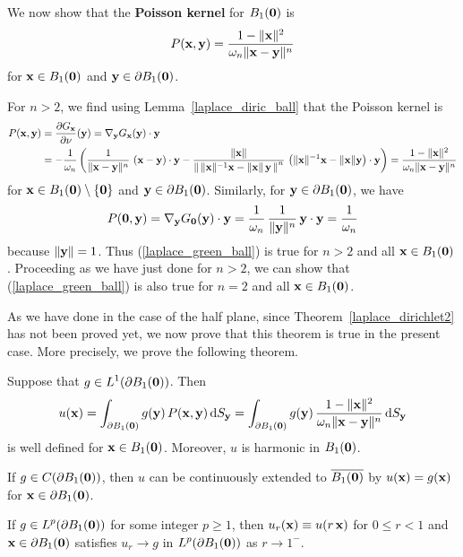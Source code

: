 We now show that the {\bfseries Poisson kernel}
for $B_1(\mathbf{0})$ is
\begin{equation} \label{laplace_green_ball}
P(\mathbf{x},\mathbf{y}) =
\frac{1-\|\mathbf{x}\|^2}{\omega_n \|\mathbf{x}-\mathbf{y}\|^n}
\end{equation}
for $\mathbf{x}\in B_1(\mathbf{0})$ and $\mathbf{y} \in \partial B_1(\mathbf{0})$.

For $n>2$, we find using Lemma~\ref{laplace_diric_ball} that the
Poisson kernel is
\begin{align*}
P(\mathbf{x},\mathbf{y}) &= \frac{\partial{G_{\mathbf{x}}}}{\partial \mathbf{\nu}}(\mathbf{y}) =
\nabla_{\mathbf{y}} G_{\mathbf{x}}(\mathbf{y}) \cdot \mathbf{y} \\
&= - \frac{1}{\omega_n} \left( \frac{1}{\| \mathbf{x} - \mathbf{y}\|^{n}}
\, \left(\mathbf{x}-\mathbf{y}\right) \cdot \mathbf{y} -
\frac{\|\mathbf{x}\|}
{\left\| \, \|\mathbf{x}\|^{-1}\mathbf{x} - \|\mathbf{x}\|\,\mathbf{y}\, \right\|^{n}}
\, \left( \|\mathbf{x}\|^{-1}\mathbf{x} - \|\mathbf{x}\|\mathbf{y}
\right) \cdot \mathbf{y} \right)
= \frac{1-\|\mathbf{x}\|^2}{\omega_n \|\mathbf{x}-\mathbf{y}\|^n}
\end{align*}
for $\mathbf{x} \in B_1(\mathbf{0})\setminus \{\mathbf{0}\}$ and
$\mathbf{y} \in \partial B_1(\mathbf{0})$.  Similarly, for
$\mathbf{y} \in \partial B_1(\mathbf{0})$, we have
\[
P(\mathbf{0},\mathbf{y}) = \nabla_{\mathbf{y}} G_{\mathbf{0}}(\mathbf{y}) \cdot \mathbf{y}
= \frac{1}{\omega_n} \, \frac{1}{\|\mathbf{y}\|^{n}}
\, \mathbf{y} \cdot \mathbf{y} = \frac{1}{\omega_n}
\]
because $\|\mathbf{y}\|=1$.
Thus (\ref{laplace_green_ball}) is true for $n>2$ and all
$\mathbf{x} \in B_1(\mathbf{0})$.  Proceeding as we have just done for
$n>2$, we can show that (\ref{laplace_green_ball}) is also true for
$n=2$ and all $\mathbf{x} \in B_1(\mathbf{0})$.

As we have done in the case of the half plane, since
Theorem~\ref{laplace_dirichlet2} has not been proved yet, we now prove
that this theorem is true in the present case.  More precisely, we
prove the following theorem.

\begin{theorem} \label{laplace_exist_ball}
Suppose that $\displaystyle g \in L^1(\partial B_1(\mathbf{0}))$.  Then
\[
u(\mathbf{x}) = \int_{\partial B_1(\mathbf{0})} g(\mathbf{y}) \,
P(\mathbf{x},\mathbf{y}) \,\mathrm{d}{S}_{\mathbf{y}}
= \int_{\partial B_1(\mathbf{0})} g(\mathbf{y}) \,
\frac{1-\|\mathbf{x}\|^2}{\omega_n \|\mathbf{x}-\mathbf{y}\|^n} \,\mathrm{d}{S}_{\mathbf{y}}
\]
is well defined for $\mathbf{x} \in B_1(\mathbf{0})$.
Moreover, $u$ is harmonic in $B_1(\mathbf{0})$.

If $g\in C(\partial B_1(\mathbf{0}))$, then $u$ can be
continuously extended to $\overline{B_1(\mathbf{0})}$ by
$u(\mathbf{x}) = g(\mathbf{x})$ for $\mathbf{x} \in \partial B_1(\mathbf{0})$.

If $\displaystyle g \in L^p(\partial B_1(\mathbf{0}))$ for some integer
$p \geq 1$, then $u_r(\mathbf{x}) \equiv u(r\,\mathbf{x})$ for $0\leq r < 1$ and
$\mathbf{x} \in \partial B_1(\mathbf{0})$ satisfies $u_r \rightarrow g$ in
$\displaystyle L^p(\partial B_1(\mathbf{0}))$ as $r \rightarrow 1^-$.
\end{theorem}

